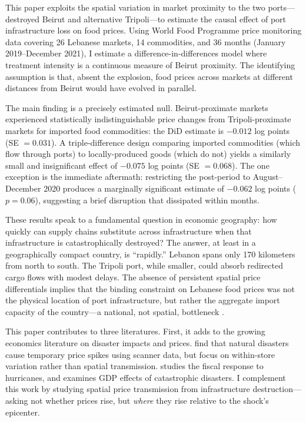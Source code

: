 \documentclass[12pt]{article}
\begin{document}
This paper exploits the spatial variation in market proximity to the two ports---destroyed Beirut and alternative Tripoli---to estimate the causal effect of port infrastructure loss on food prices. Using World Food Programme price monitoring data covering 26 Lebanese markets, 14 commodities, and 36 months (January 2019--December 2021), I estimate a difference-in-differences model where treatment intensity is a continuous measure of Beirut proximity. The identifying assumption is that, absent the explosion, food prices across markets at different distances from Beirut would have evolved in parallel.

The main finding is a precisely estimated null. Beirut-proximate markets experienced statistically indistinguishable price changes from Tripoli-proximate markets for imported food commodities: the DiD estimate is $-0.012$ log points (SE $= 0.031$). A triple-difference design comparing imported commodities (which flow through ports) to locally-produced goods (which do not) yields a similarly small and insignificant effect of $-0.075$ log points (SE $= 0.068$). The one exception is the immediate aftermath: restricting the post-period to August--December 2020 produces a marginally significant estimate of $-0.062$ log points ($p = 0.06$), suggesting a brief disruption that dissipated within months.

These results speak to a fundamental question in economic geography: how quickly can supply chains substitute across infrastructure when that infrastructure is catastrophically destroyed? The answer, at least in a geographically compact country, is ``rapidly.'' Lebanon spans only 170 kilometers from north to south. The Tripoli port, while smaller, could absorb redirected cargo flows with modest delays. The absence of persistent spatial price differentials implies that the binding constraint on Lebanese food prices was not the physical location of port infrastructure, but rather the aggregate import capacity of the country---a national, not spatial, bottleneck \citep{allen2014trade}.

This paper contributes to three literatures. First, it adds to the growing economics literature on disaster impacts and prices. \citet{cavallo2014prices} find that natural disasters cause temporary price spikes using scanner data, but focus on within-store variation rather than spatial transmission. \citet{deryugina2017fiscal} studies the fiscal response to hurricanes, and \citet{cavallo2013catastrophic} examines GDP effects of catastrophic disasters. I complement this work by studying spatial price transmission from infrastructure destruction---asking not whether prices rise, but \textit{where} they rise relative to the shock's epicenter.
\end{document}
